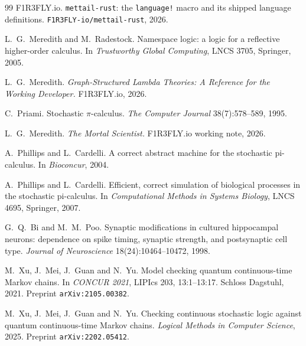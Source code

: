 \documentclass[11pt,a4paper]{article}
\theoremstyle{plain}
\theoremstyle{definition}
\theoremstyle{remark}
\begin{document}
\begin{thebibliography}{99}
 F1R3FLY.io. \texttt{mettail-rust}: the \texttt{language!} macro and its shipped
language definitions. \texttt{F1R3FLY-io/mettail-rust}, 2026.

 L.\ G.\ Meredith and M.\ Radestock. Namespace logic: a logic for a reflective
higher-order calculus. In \emph{Trustworthy Global Computing}, LNCS 3705, Springer, 2005.

 L.\ G.\ Meredith. \emph{Graph-Structured Lambda Theories: A Reference for the
Working Developer.} F1R3FLY.io, 2026.

 C.\ Priami. Stochastic $\pi$-calculus. \emph{The Computer Journal} 38(7):578--589,
1995.

 L.\ G.\ Meredith. \emph{The Mortal Scientist.} F1R3FLY.io working note, 2026.

 A.\ Phillips and L.\ Cardelli. A correct abstract machine for the stochastic
pi-calculus. In \emph{Bioconcur}, 2004.

 A.\ Phillips and L.\ Cardelli. Efficient, correct simulation of biological
processes in the stochastic pi-calculus. In \emph{Computational Methods in Systems Biology}, LNCS
4695, Springer, 2007.

 G.\ Q.\ Bi and M.\ M.\ Poo. Synaptic modifications in cultured hippocampal neurons:
dependence on spike timing, synaptic strength, and postsynaptic cell type. \emph{Journal of
Neuroscience} 18(24):10464--10472, 1998.

 M.\ Xu, J.\ Mei, J.\ Guan and N.\ Yu. Model checking quantum continuous-time Markov
chains. In \emph{CONCUR 2021}, LIPIcs 203, 13:1--13:17. Schloss Dagstuhl, 2021. Preprint
\texttt{arXiv:2105.00382}.

 M.\ Xu, J.\ Mei, J.\ Guan and N.\ Yu. Checking continuous stochastic logic
against quantum continuous-time Markov chains. \emph{Logical Methods in Computer Science}, 2025.
Preprint \texttt{arXiv:2202.05412}.

\end{thebibliography}
\end{document}
